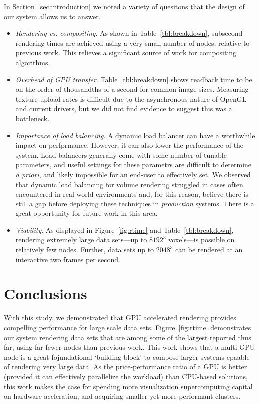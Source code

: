 In Section~\ref{sec:introduction} we noted a variety of quesitons that the
design of our system allows us to answer.

\begin{itemize}

  \item \textit{Rendering vs. compositing}.  As shown in
  Table~\ref{tbl:breakdown}, subsecond rendering times are achieved
  using a very small number of nodes, relative to previous work.  This
  relieves a significant source of work for compositing algorithms.

  \item \textit{Overhead of GPU transfer}.  Table~\ref{tbl:breakdown}
  shows readback time to be on the order of thousandths of a second for
  common image sizes.  Measuring texture upload rates is difficult due
  to the asynchronous nature of OpenGL and current drivers, but we did
  not find evidence to suggest this was a bottleneck.

  \item \textit{Importance of load balancing}.  A dynamic load balancer
  can have a worthwhile impact on perfprmance.  However, it can also
  lower the performance of the system.  Load balancers generally come
  with some number of tunable parameters, and useful settings for
  these parametrs are difficult to determine \textit{a priori}, and
  likely impossible for an end-user to effectively set.  We observed
  that dynamic load balancing for volume rendering struggled in cases
  often encountered in real-world environments and, for this reason,
  believe there is still a gap before deploying these techniques in
  \emph{production} systems.  There is a great opportunity for future
  work in this area.

  \item \textit{Viability}.  As displayed in Figure~\ref{fig:rtime} and
  Table~\ref{tbl:breakdown}, rendering extremely large data sets---up
  to $8192^3$ voxels---is possible on relatively few nodes.  Further,
  data sets up to $2048^3$ can be rendered at an interactive two frames
  per second.

\end{itemize}

\section{Conclusions}
\label{sec:conclusions}

With this study, we demonstrated that GPU accelerated rendering
provides compelling performance for large scale data sets.
Figure~\ref{fig:rtime} demonstrates our system rendering data sets
that are among some of the largest reported thus far, using far fewer
nodes than previous work.  This work shows that a multi-GPU node is a
great fojundational `building block' to compose larger systems cpaable
of rendering very large data.  As the price-performance ratio of a
GPU is better (provided it can effectively parallelize the workload)
than CPU-based solutions, this work makes the case for spending more
visualization supercomputing capital on hardware accleration, and
acquiring smaller yet more performant clusters.


